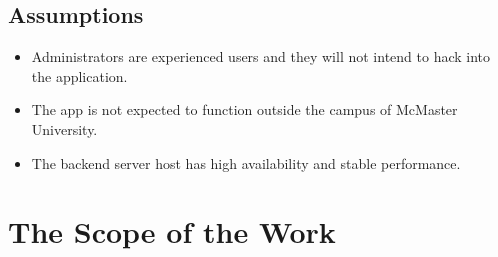 \documentclass[12pt]{article}
\begin{document}
\subsection{Assumptions}
\begin{itemize}
 \item Administrators are experienced users and they will not intend to hack into the application.
  \item The app is not expected to function outside the campus of McMaster University.
  \item The backend server host has high availability and stable performance.
\end{itemize}

\section{The Scope of the Work}
\end{document}
